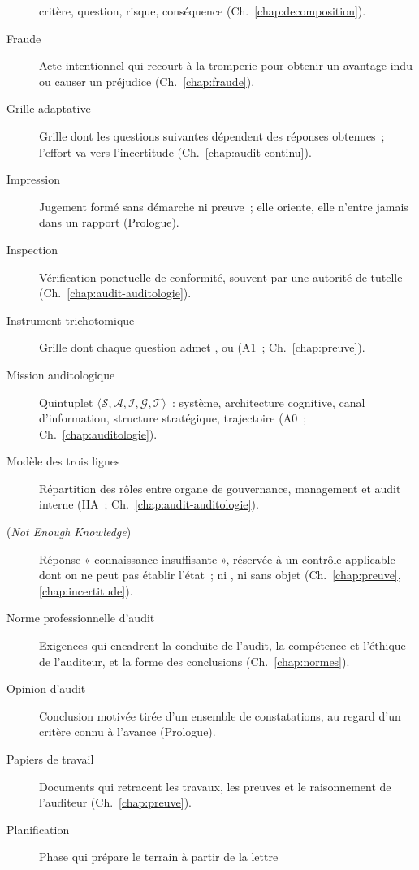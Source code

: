 \begin{description}
          critère, question, risque, conséquence (Ch.~\ref{chap:decomposition}).
    \item[Fraude] Acte intentionnel qui recourt à la tromperie pour obtenir
          un avantage indu ou causer un préjudice (Ch.~\ref{chap:fraude}).
    \item[Grille adaptative] Grille dont les questions suivantes dépendent
          des réponses obtenues~; l'effort va vers l'incertitude
          (Ch.~\ref{chap:audit-continu}).
    \item[Impression] Jugement formé sans démarche ni preuve~; elle oriente,
          elle n'entre jamais dans un rapport (Prologue).
    \item[Inspection] Vérification ponctuelle de conformité, souvent par une
          autorité de tutelle (Ch.~\ref{chap:audit-auditologie}).
    \item[Instrument trichotomique] Grille dont chaque question admet
          \OUI{}, \NON{} ou \NEK{} (A1~; Ch.~\ref{chap:preuve}).
    \item[Mission auditologique] Quintuplet
          $\langle \mathcal{S}, \mathcal{A}, \mathcal{I}, \mathcal{G},
          \mathcal{T} \rangle$~: système, architecture cognitive, canal
          d'information, structure stratégique, trajectoire
          (A0~; Ch.~\ref{chap:auditologie}).
    \item[Modèle des trois lignes] Répartition des rôles entre organe de
          gouvernance, management et audit interne (IIA~;
          Ch.~\ref{chap:audit-auditologie}).
    \item[\NEK{} (\textit{Not Enough Knowledge})] Réponse « connaissance
          insuffisante », réservée à un contrôle applicable dont on ne peut
          pas établir l'état~; ni \NON{}, ni sans objet
          (Ch.~\ref{chap:preuve}, \ref{chap:incertitude}).
    \item[Norme professionnelle d'audit] Exigences qui encadrent la conduite
          de l'audit, la compétence et l'éthique de l'auditeur, et la forme
          des conclusions (Ch.~\ref{chap:normes}).
    \item[Opinion d'audit] Conclusion motivée tirée d'un ensemble de
          constatations, au regard d'un critère connu à l'avance
          (Prologue).
    \item[Papiers de travail] Documents qui retracent les travaux, les
          preuves et le raisonnement de l'auditeur (Ch.~\ref{chap:preuve}).
    \item[Planification] Phase qui prépare le terrain à partir de la lettre

\end{description}
